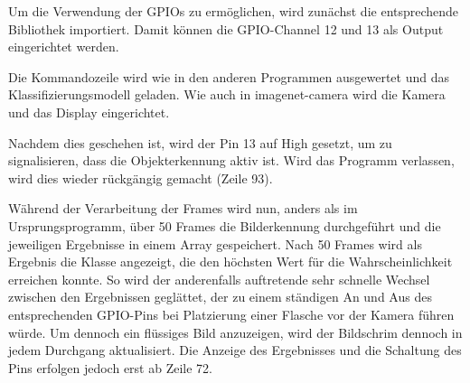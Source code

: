 Um die Verwendung der GPIOs zu ermöglichen, wird zunächst die entsprechende Bibliothek importiert. Damit können die GPIO-Channel 12 und 13 als Output eingerichtet werden.

Die Kommandozeile wird wie in den anderen Programmen ausgewertet und das Klassifizierungsmodell geladen. Wie auch in imagenet-camera wird die Kamera und das Display eingerichtet.

\medskip

Nachdem dies geschehen ist, wird der Pin 13 auf High gesetzt, um zu signalisieren, dass die Objekterkennung aktiv ist. Wird das Programm verlassen, wird dies wieder rückgängig gemacht (Zeile 93).

\medskip

Während der Verarbeitung der Frames wird nun, anders als im Ursprungsprogramm, über 50 Frames die Bilderkennung durchgeführt und die jeweiligen Ergebnisse in einem Array gespeichert. Nach 50 Frames wird als Ergebnis die Klasse angezeigt, die den höchsten Wert für die Wahrscheinlichkeit erreichen konnte. So wird der anderenfalls auftretende sehr schnelle Wechsel zwischen den Ergebnissen geglättet, der zu einem ständigen An und Aus des entsprechenden GPIO-Pins bei Platzierung einer Flasche vor der Kamera führen würde. Um dennoch ein flüssiges Bild anzuzeigen, wird der Bildschrim dennoch in jedem Durchgang aktualisiert. Die Anzeige des Ergebnisses und die Schaltung des Pins erfolgen jedoch erst ab Zeile 72.

